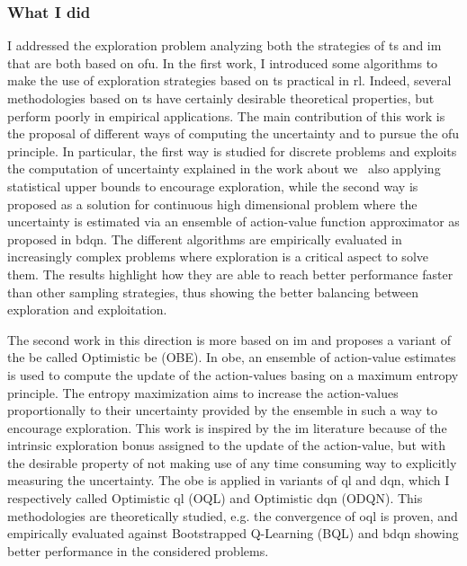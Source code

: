 \subsubsection{What I did}
I addressed the exploration problem analyzing both the strategies of \gls{ts} and \gls{im} that are both based on \gls{ofu}. In the first work, I introduced some algorithms to make the use of exploration strategies based on \gls{ts} practical in \gls{rl}. Indeed, several methodologies based on \gls{ts} have certainly desirable theoretical properties, but perform poorly in empirical applications. The main contribution of this work is the proposal of different ways of computing the uncertainty and to pursue the \gls{ofu} principle. In particular, the first way is studied for discrete problems and exploits the computation of uncertainty explained in the work about \gls{we}~\cite{deramo2016estimating} also applying statistical upper bounds to encourage exploration, while the second way is proposed as a solution for continuous high dimensional problem where the uncertainty is estimated via an ensemble of action-value function approximator as proposed in \gls{bdqn}. The different algorithms are empirically evaluated in increasingly complex problems where exploration is a critical aspect to solve them. The results highlight how they are able to reach better performance faster than other sampling strategies, thus showing the better balancing between exploration and exploitation.

The second work in this direction is more based on \gls{im} and proposes a variant of the \gls{be} called Optimistic \gls{be} (OBE). In \gls{obe}, an ensemble of action-value estimates is used to compute the update of the action-values basing on a maximum entropy principle. The entropy maximization aims to increase the action-values proportionally to their uncertainty provided by the ensemble in such a way to encourage exploration. This work is inspired by the \gls{im} literature because of the intrinsic exploration bonus assigned to the update of the action-value, but with the desirable property of not making use of any time consuming way to explicitly measuring the uncertainty. The \gls{obe} is applied in variants of \gls{ql} and \gls{dqn}, which I respectively called Optimistic \gls{ql} (OQL) and Optimistic \gls{dqn} (ODQN). This methodologies are theoretically studied, e.g. the convergence of \gls{oql} is proven, and empirically evaluated against Bootstrapped Q-Learning (BQL) and \gls{bdqn} showing better performance in the considered problems.

